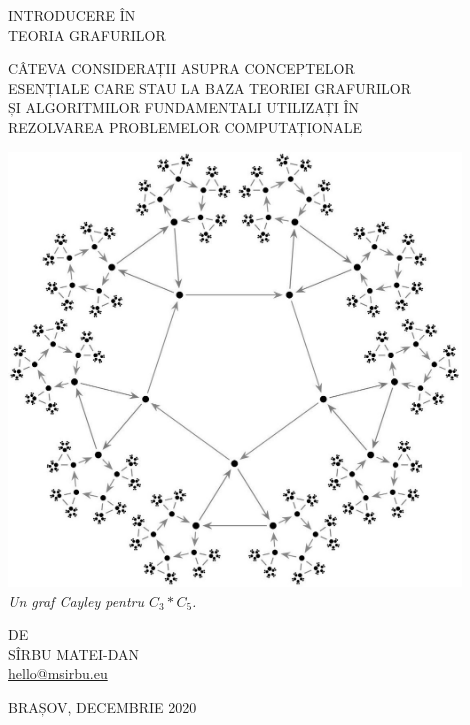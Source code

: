 \documentclass[9pt,a4paper]{report}
\begin{document}
\thispagestyle{empty}

\begin{center}
    \bfseries

    \Huge
    INTRODUCERE ÎN \\
    TEORIA GRAFURILOR
    \vspace{25pt}

    \normalsize
    CÂTEVA CONSIDERAȚII ASUPRA CONCEPTELOR \\
    ESENȚIALE CARE STAU LA BAZA TEORIEI GRAFURILOR \\
    ȘI ALGORITMILOR FUNDAMENTALI UTILIZAȚI ÎN \\
    REZOLVAREA PROBLEMELOR COMPUTAȚIONALE \\
    \vspace{25pt}

    \includegraphics[width=0.9\textwidth]{img/cayley_graph} \\
    \textnormal{\textit{Un graf Cayley pentru $C_3 * C_5$.}}
    \vspace{25pt}

    \small
    DE\\

    \Large
    SÎRBU MATEI-DAN \\
    \href{mailto:hello@msirbu.eu}{hello@msirbu.eu} \\
    \vspace{25pt}

    BRAȘOV, DECEMBRIE 2020
\end{center}
\end{document}
